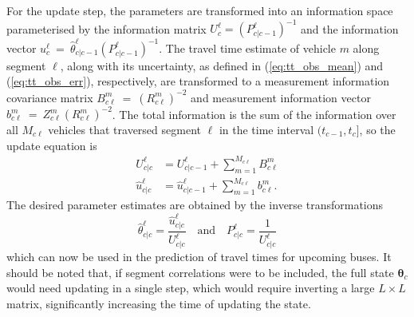 For the update step, the parameters are transformed into an information
space parameterised by the information matrix $U^\ell_c = (P_{c|c-1}^\ell)^{-1}$
and the information vector $u^\ell_c~=~\hat \theta^\ell_{c|c-1} (P^\ell_{c|c-1})^{-1}$.
The travel time estimate of vehicle $m$ along segment $\ell$,
along with its uncertainty, 
as defined in (\ref{eq:tt_obs_mean}) and (\ref{eq:tt_obs_err}), respectively,
are transformed to a measurement information covariance matrix 
$B_{c\ell}^{m}~=~(R_{c\ell}^m)^{-2}$
and measurement information vector $b_{c\ell}^{m}~=~Z_{c\ell}^{m} (R_{c\ell}^{m})^{-2}$.
The total information is the sum of the information over all $M_{c\ell}$ vehicles
that traversed segment $\ell$ in the time interval $(t_{c-1}, t_c]$,
so the update equation is
\begin{align*}
U^\ell_{c|c} &= U^\ell_{c|c-1} + \sum_{m=1}^{M_{c\ell}} B_{c\ell}^{m} \\
\hat u^\ell_{c|c} &= \hat u^\ell_{c|c-1} + \sum_{m=1}^{M_{c\ell}} b_{c\ell}^{m}.
\end{align*}
The desired parameter estimates are obtained 
by the inverse transformations
\begin{equation*}
\hat \theta^\ell_{c|c} = \frac{\hat u^\ell_{c|c}}{U^\ell_{c|c}} 
\quad\text{and}\quad
P^\ell_{c|c} = \frac{1}{U^\ell_{c|c}}
\end{equation*}
which can now be used in the prediction of travel times
for upcoming buses. 
It should be noted that, if segment correlations were to be included,
the full state $\boldsymbol{\theta}_c$ would need updating in a single step,
which would require inverting a large $L\times L$ matrix,
significantly increasing the time of updating the state.




